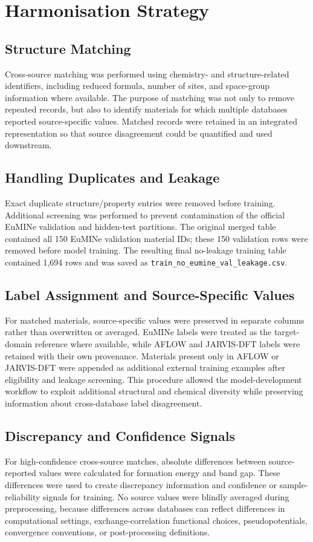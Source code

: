 \documentclass[10pt, a4paper]{article}
\begin{document}
\section{Harmonisation Strategy}

\subsection{Structure Matching}
Cross-source matching was performed using chemistry- and structure-related identifiers, including reduced formula, number of sites, and space-group information where available. The purpose of matching was not only to remove repeated records, but also to identify materials for which multiple databases reported source-specific values. Matched records were retained in an integrated representation so that source disagreement could be quantified and used downstream.

\subsection{Handling Duplicates and Leakage}
Exact duplicate structure/property entries were removed before training. Additional screening was performed to prevent contamination of the official EuMINe validation and hidden-test partitions. The original merged table contained all 150 EuMINe validation material IDs; these 150 validation rows were removed before model training. The resulting final no-leakage training table contained 1,694 rows and was saved as \texttt{train\_no\_eumine\_val\_leakage.csv}.

\subsection{Label Assignment and Source-Specific Values}
For matched materials, source-specific values were preserved in separate columns rather than overwritten or averaged. EuMINe labels were treated as the target-domain reference where available, while AFLOW and JARVIS-DFT labels were retained with their own provenance. Materials present only in AFLOW or JARVIS-DFT were appended as additional external training examples after eligibility and leakage screening. This procedure allowed the model-development workflow to exploit additional structural and chemical diversity while preserving information about cross-database label disagreement.

\subsection{Discrepancy and Confidence Signals}
For high-confidence cross-source matches, absolute differences between source-reported values were calculated for formation energy and band gap. These differences were used to create discrepancy information and confidence or sample-reliability signals for training. No source values were blindly averaged during preprocessing, because differences across databases can reflect differences in computational settings, exchange-correlation functional choices, pseudopotentials, convergence conventions, or post-processing definitions.
\end{document}
